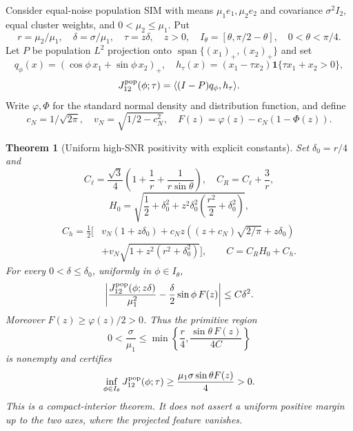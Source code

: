 \documentclass{article} %
\theoremstyle{plain}
\newtheorem{theorem}{Theorem}[section]
\theoremstyle{definition}
\theoremstyle{remark}
\begin{document}
Consider equal-noise population SIM with means $\mu_1e_1,\mu_2e_2$ and
covariance $\sigma^2I_2$, equal cluster weights, and
$0<\mu_2\le\mu_1$. Put
\[
 r=\mu_2/\mu_1,\quad \delta=\sigma/\mu_1,\quad
 \tau=z\delta,\quad z>0,\quad
 I_\theta=[\theta,\pi/2-\theta],\quad 0<\theta<\pi/4.
\]
Let $P$ be population $L^2$ projection onto
$\operatorname{span}\{(x_1)_+,(x_2)_+\}$ and set
\[
 q_\phi(x)=(\cos\phi\,x_1+\sin\phi\,x_2)_+,\quad
 h_\tau(x)=(x_1-\tau x_2)\mathbf1\{\tau x_1+x_2>0\},
\]
\[
 J_{12}^{\rm pop}(\phi;\tau)=\langle(I-P)q_\phi,h_\tau\rangle.
\]
Write $\varphi,\Phi$ for the standard normal density and distribution
function, and define
\[
 c_N=1/\sqrt{2\pi},\quad v_N=\sqrt{1/2-c_N^2},\quad
 F(z)=\varphi(z)-c_N(1-\Phi(z)).
\]

\begin{theorem}[Uniform high-SNR positivity with explicit constants]
\label{sbgen:J-positive}
Set $\delta_0=r/4$ and
\[
 C_\ell=\frac{\sqrt3}{4}
       \left(1+\frac1r+\frac1{r\sin\theta}\right),\quad
 C_R=C_\ell+\frac3r,
\]
\[
 H_0=\sqrt{\frac12+\delta_0^2
                   +z^2\delta_0^2\left(\frac{r^2}2+\delta_0^2\right)},
\]
\[
 \begin{split}
 C_h=\frac12\bigg[&v_N(1+z\delta_0)
 +c_Nz\left((z+c_N)\sqrt{2/\pi}+z\delta_0\right)\\
 &+v_N\sqrt{1+z^2(r^2+\delta_0^2)}\bigg],
 \qquad C=C_RH_0+C_h.
 \end{split}
\]
For every $0<\delta\le\delta_0$, uniformly in $\phi\in I_\theta$,
\begin{equation}\label{sbgen:J-expansion}
 \left|\frac{J_{12}^{\rm pop}(\phi;z\delta)}{\mu_1^2}
       -\frac\delta2\sin\phi\,F(z)\right|\le C\delta^2.
\end{equation}
Moreover $F(z)\ge\varphi(z)/2>0$. Thus the primitive region
\begin{equation}\label{sbgen:J-region}
 0<\frac\sigma{\mu_1}\le
 \min\left\{\frac r4,\frac{\sin\theta\,F(z)}{4C}\right\}
\end{equation}
is nonempty and certifies
\begin{equation}\label{sbgen:J-margin}
 \inf_{\phi\in I_\theta}J_{12}^{\rm pop}(\phi;\tau)
 \ge\frac{\mu_1\sigma\sin\theta F(z)}4>0.
\end{equation}
This is a compact-interior theorem. It does not assert a uniform positive
margin up to the two axes, where the projected feature vanishes.
\end{theorem}
\end{document}
